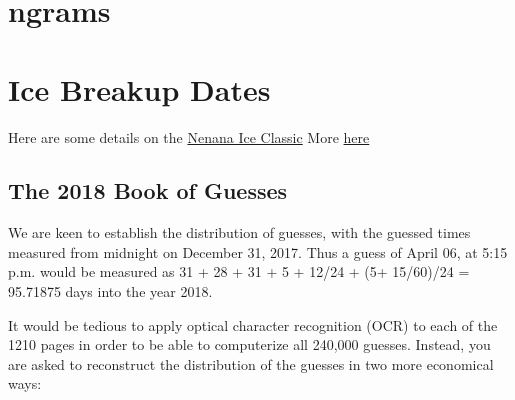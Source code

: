 \documentclass[]{book}
\begin{document}
\hypertarget{ngrams-1}{%
\section{ngrams}\label{ngrams-1}}

\hypertarget{ice-breakup-dates-1}{%
\section{Ice Breakup Dates}\label{ice-breakup-dates-1}}

Here are some details on the
\href{http://www.nenanaakiceclassic.com}{Nenana Ice Classic}
More \href{http://www.john-daly.com/nenana.htm}{here}

\hypertarget{the-2018-book-of-guesses-1}{%
\subsection{The 2018 Book of Guesses}\label{the-2018-book-of-guesses-1}}

We are keen to establish the distribution of guesses, with the guessed times measured from midnight on December 31, 2017. Thus a guess of April 06, at 5:15 p.m. would be measured as 31 + 28 + 31 + 5 + 12/24 + (5+ 15/60)/24 = 95.71875 days into the year 2018.

It would be tedious to apply optical character recognition (OCR) to each of the 1210 pages in order to be able to computerize all 240,000 guesses. Instead, you are asked to reconstruct the distribution of the guesses in two more economical ways:
\end{document}
